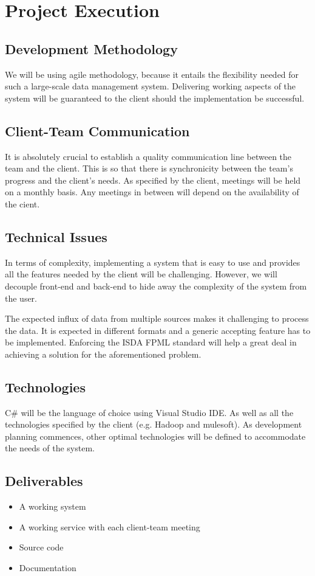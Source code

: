 \documentclass[12pt]{article}
\begin{document}


\newpage
\tableofcontents

\newpage



\newpage

\section{Project Execution}
\subsection{Development Methodology}
	\par{We will be using agile methodology, because it entails the flexibility needed for such a large-scale data management system. Delivering working aspects of the system will be guaranteed to the client should the implementation be successful.}
\subsection{Client-Team Communication}
	\par{It is absolutely crucial to establish a quality communication line between the team and the client. This is so that there is synchronicity between the team's progress and the client's needs. As specified by the client, meetings will be held on a monthly basis. Any meetings in between will depend on the availability of the cient.}
\subsection{Technical Issues}
	\par{In terms of complexity, implementing a system that is easy to use and provides all the features needed by the client will be challenging. However, we will decouple front-end and back-end to hide away the complexity of the system from the user.}
	\par{The expected influx of data from multiple sources makes it challenging to process the data. It is expected in different formats and a generic accepting feature has to be implemented. Enforcing the ISDA FPML standard will help a great deal in achieving a solution for the aforementioned problem.}
\subsection{Technologies}
	\par{C\# will be the language of choice using Visual Studio IDE. As well as all the technologies specified by the client (e.g. Hadoop and mulesoft). As development planning commences, other optimal technologies will be defined to accommodate the needs of the system.}
\subsection{Deliverables}
	\begin{itemize}
		\item A working system
		\item A working service with each client-team meeting
		\item Source code
		\item Documentation
	\end{itemize}
\end{document}
